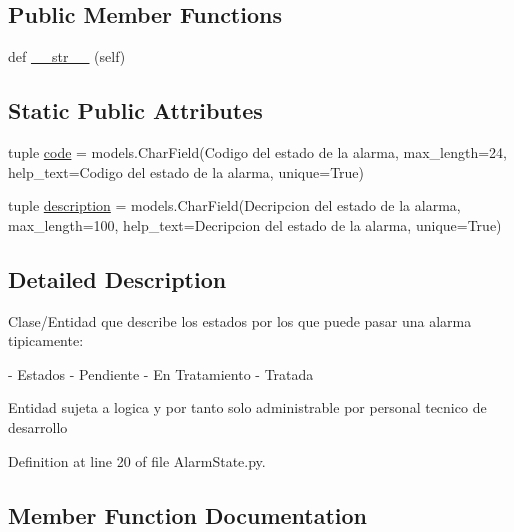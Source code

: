 \subsection*{Public Member Functions}
\begin{DoxyCompactItemize}
\item 
def \hyperlink{class_ground_segment_1_1models_1_1_alarm_1_1_alarm_state_1_1_alarm_state_ae124a7c4bc6fa2d440ed82de820ca094}{\+\_\+\+\_\+str\+\_\+\+\_\+} (self)
\end{DoxyCompactItemize}
\subsection*{Static Public Attributes}
\begin{DoxyCompactItemize}
\item 
tuple \hyperlink{class_ground_segment_1_1models_1_1_alarm_1_1_alarm_state_1_1_alarm_state_a4d7b384d8800c63ca484643599e05f60}{code} = models.\+Char\+Field(\textquotesingle{}Codigo del estado de la alarma\textquotesingle{}, max\+\_\+length=24, help\+\_\+text=\textquotesingle{}Codigo del estado de la alarma\textquotesingle{}, unique=True)
\item 
tuple \hyperlink{class_ground_segment_1_1models_1_1_alarm_1_1_alarm_state_1_1_alarm_state_ad84292177e0fc7bdbcfa7e0a5a928ea6}{description} = models.\+Char\+Field(\textquotesingle{}Decripcion del estado de la alarma\textquotesingle{}, max\+\_\+length=100, help\+\_\+text=\textquotesingle{}Decripcion del estado de la alarma\textquotesingle{}, unique=True)
\end{DoxyCompactItemize}


\subsection{Detailed Description}
\begin{DoxyVerb}Clase/Entidad que describe los estados por los que puede pasar una alarma tipicamente:

    - Estados
        - Pendiente
        - En Tratamiento
        - Tratada
        
Entidad sujeta a logica y por tanto solo administrable por personal tecnico de desarrollo    
\end{DoxyVerb}
 

Definition at line 20 of file Alarm\+State.\+py.



\subsection{Member Function Documentation}
\hypertarget{class_ground_segment_1_1models_1_1_alarm_1_1_alarm_state_1_1_alarm_state_ae124a7c4bc6fa2d440ed82de820ca094}{}

